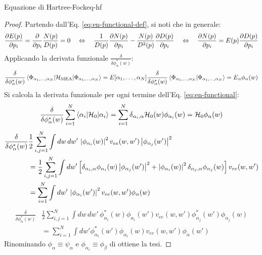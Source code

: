 \begin{theorem}{Equazione di Hartree-Fock}{eq-hf}
	\begin{proof}
		Partendo dall'Eq. \ref{eq:en-functional-def}, si noti che in generale:
		\begin{equation*}
			\frac{\partial E(p)}{\partial p_i} = \frac{\partial}{\partial p_i} \frac{N(p)}{D(p)} = 0
			\quad \Leftrightarrow \quad
			\frac{1}{D(p)} \frac{\partial N(p)}{\partial p_i} - \frac{N(p)}{D^2(p)} \frac{\partial D(p)}{\partial p_i}
			\quad \Leftrightarrow \quad
			\frac{\partial N(p)}{\partial p_i} = E(p) \frac{\partial D(p)}{\partial p_i}
		\end{equation*}
		Applicando la derivata funzionale $ \frac{\delta}{\delta \phi_\alpha^*(w)} $:
		\begin{equation*}
			\frac{\delta}{\delta \phi_\alpha^*(w)} \braket{\Phi_{\alpha_1, \dots, \alpha_N} | \mathcal{H}_\text{MEA} | \Phi_{\alpha_1, \dots, \alpha_N}} = E[\alpha_1, \dots, \alpha_N] \frac{\delta}{\delta \phi_\alpha^*(w)} \braket{\Phi_{\alpha_1, \dots, \alpha_N} | \Phi_{\alpha_1, \dots, \alpha_N}} = E_\alpha \phi_\alpha(w)
		\end{equation*}
		Si calcola la derivata funzionale per ogni termine dell'Eq. \ref{eq:en-functional}:
		\begin{equation*}
			\frac{\delta}{\delta \phi_\alpha^*(w)} \sum_{i = 1}^{N} \braket{\alpha_i | \mathcal{H}_0 | \alpha_i} = \sum_{i = 1}^{N} \delta_{\alpha_i,\alpha} \mathcal{H}_0(w) \phi_{\alpha_i}(w) = \mathcal{H}_0 \phi_\alpha(w)
		\end{equation*}
		\begin{equation*}
			\begin{split}
				\frac{\delta}{\delta \phi_\alpha^*(w)}
				& \frac{1}{2} \sum_{i,j = 1}^{N} \int dw\,dw'\, \left\lvert\phi_{\alpha_i}(w)\right\rvert^2 v_{ee}(w,w') \left\lvert\phi_{\alpha_j}(w')\right\rvert^2 \\
				& = \frac{1}{2} \sum_{i,j = 1}^{N} \int dw' \left[ \delta_{\alpha_i,\alpha} \phi_{\alpha_i}(w) \left\lvert\phi_{\alpha_j}(w')\right\rvert^2 + \left\lvert\phi_{\alpha_i}(w)\right\rvert^2 \delta_{\alpha_j,\alpha} \phi_{\alpha_j}(w) \right] v_{ee}(w,w') \\
				& = \sum_{i = 1}^{N} \int dw'\, \left\lvert\phi_{\alpha_i}(w')\right\rvert^2 v_{ee}(w,w') \phi_\alpha(w)
			\end{split}
		\end{equation*}
		\begin{equation*}
			\begin{split}
				\frac{\delta}{\delta \phi_\alpha^*(w)}
				& \frac{1}{2} \sum_{i,j = 1}^{N} \int dw\,dw'\, \phi_{\alpha_i}^*(w) \phi_{\alpha_i}(w') v_{ee}(w,w') \phi_{\alpha_j}^*(w') \phi_{\alpha_j}(w) \\
				& = \sum_{i = 1}^{N} \int dw' \phi_{\alpha_i}^*(w') \phi_{\alpha_i}(w) v_{ee}(w,w') \phi_\alpha(w')
			\end{split}
		\end{equation*}
		Rinominando $ \phi_\alpha \equiv \psi_\alpha $ e $ \phi_{\alpha_i} \equiv \phi_\beta $ di ottiene la tesi.
	\end{proof}
\end{theorem}

